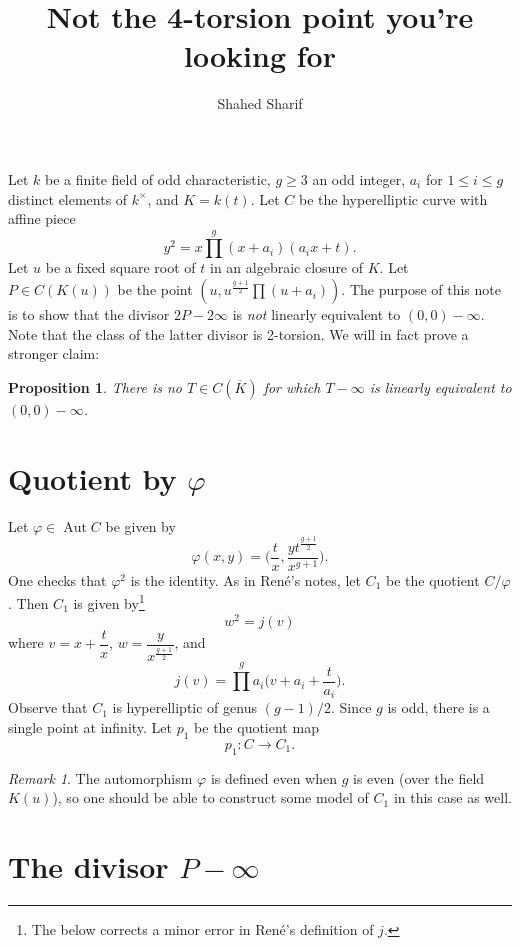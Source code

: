 \documentclass{article}
\theoremstyle{plain}
\newtheorem{proposition}[theorem]{Proposition}
\theoremstyle{definition}
\theoremstyle{remark}
\newtheorem{remark}[theorem]{Remark}
\renewcommand{\phi}{\varphi}
\DeclareMathOperator{\Aut}{Aut}
\newcommand{\Kb}{\overline{K}}
\begin{document}
\title{Not the 4-torsion point you're looking for}
\author{Shahed Sharif}
\maketitle

Let $k$ be a finite field of odd characteristic, $g \geq 3$ an odd integer, $a_i$ for $1 \leq i \leq g$ distinct elements of $k^\times$, and $K = k(t)$. Let $C$ be the hyperelliptic curve with affine piece
\[
y^2 = x \prod^g (x + a_i)(a_i x + t).
\]
Let $u$ be a fixed square root of $t$ in an algebraic closure of $K$. Let $P \in C(K(u))$ be the point $(u, u^{\frac{g+1}{2}} \prod (u + a_i))$.  The purpose of this note is to show that the divisor $2P - 2\infty$ is \emph{not} linearly equivalent to $(0,0) - \infty$. Note that the class of the latter divisor is 2-torsion. We will in fact prove a stronger claim:
\begin{proposition}
  There is no $T \in C(\Kb)$ for which $T - \infty$ is linearly equivalent to $(0,0) - \infty$.
\end{proposition}


\section{Quotient by $\phi$}
\label{sec:quotient-phi}

Let $\phi \in \Aut C$ be given by
\[
\phi(x,y) = \bigg(\frac{t}{x}, \frac{yt^{\frac{g+1}{2}}}{x^{g+1}}\bigg).
\]
One checks that $\phi^2$ is the identity. As in Ren\'e's notes, let $C_1$ be the quotient $C/\phi$. Then $C_1$ is given by\footnote{The below corrects a minor error in Ren\'e's definition of $j$.}
\[
w^2 = j(v)
\]
where $v = x + \dfrac{t}{x}$, $w = \dfrac{y}{x^{\frac{g+1}{2}}}$, and
\[
j(v) = \prod^g a_i\bigg(v + a_i + \frac{t}{a_i}\bigg).
\]
Observe that $C_1$ is hyperelliptic of genus $(g-1)/2$. Since $g$ is odd, there is a single point at infinity. Let $p_1$ be the quotient map
\[
p_1: C \to C_1.
\]

\begin{remark}
  The automorphism $\phi$ is defined even when $g$ is even (over the field $K(u)$), so one should be able to construct some model of $C_1$ in this case as well.
\end{remark}


\section{The divisor $P - \infty$}
\label{sec:divisor-p-infty}
\end{document}
